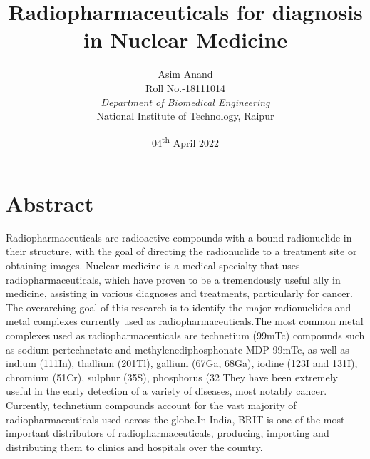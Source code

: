 \documentclass[12pt]{article}
\title{\textbf{Radiopharmaceuticals for diagnosis in Nuclear Medicine}}
\author{Asim Anand
\\
Roll No.-18111014
\\
\textit{Department of Biomedical Engineering}
\\
National Institute of Technology, Raipur
}
\date{04\textsuperscript{th} April 2022}
\begin{document}
\maketitle

\section{Abstract}
Radiopharmaceuticals are radioactive compounds with a bound radionuclide in their structure, with the goal of directing the radionuclide to a treatment site or obtaining images. Nuclear medicine is a medical specialty that uses radiopharmaceuticals, which have proven to be a tremendously useful ally in medicine, assisting in various diagnoses and treatments, particularly for cancer. The overarching goal of this research is to identify the major radionuclides and metal complexes currently used as radiopharmaceuticals.The most common metal complexes used as radiopharmaceuticals are technetium (99mTc) compounds such as sodium pertechnetate and methylenediphosphonate MDP-99mTc, as well as indium (111In), thallium (201Tl), gallium (67Ga, 68Ga), iodine (123I and 131I), chromium (51Cr), sulphur (35S), phosphorus (32 They have been extremely useful in the early detection of a variety of diseases, most notably cancer. Currently, technetium compounds account for the vast majority of radiopharmaceuticals used across the globe.In India, BRIT  is  one  of  the  most  important  distributors  of radiopharmaceuticals, producing, importing and distributing them to clinics and hospitals over the country.
\\
\end{document}
